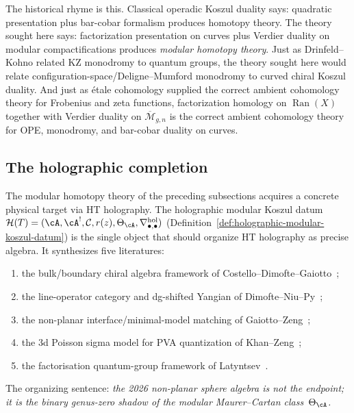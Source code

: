 The historical rhyme is this.  Classical operadic Koszul duality
says: quadratic presentation plus bar-cobar formalism produces
homotopy theory.  The theory sought here says: factorization
presentation on curves plus Verdier duality on modular
compactifications produces \emph{modular homotopy theory}.  Just as
Drinfeld--Kohno related KZ monodromy to quantum groups, the theory
sought here would relate configuration-space/Deligne--Mumford
monodromy to curved chiral Koszul duality.  And just as \'etale
cohomology supplied the correct ambient cohomology theory for
Frobenius and zeta functions, factorization homology on
$\operatorname{Ran}(X)$ together with Verdier duality on
$\overline{\mathcal{M}}_{g,n}$ is the correct ambient cohomology
theory for OPE, monodromy, and bar-cobar duality on curves.

\subsection{The holographic completion}
\label{subsec:concordance-holographic-completion}

The modular homotopy theory of the preceding subsections acquires a
concrete physical target via HT holography.  The holographic modular
Koszul datum
$\mathcal{H}(T) = (\cA, \cA^!, \mathcal{C}, r(z), \Theta_\cA,
\nabla^{\mathrm{hol}}_{\bullet,\bullet})$
(Definition~\ref{def:holographic-modular-koszul-datum})
is the single object that should organize HT holography as precise
algebra.  It synthesizes five literatures:
\begin{enumerate}[label=\textup{(\roman*)}]
\item the bulk/boundary chiral algebra framework of
  Costello--Dimofte--Gaiotto~\cite{CDG20};
\item the line-operator category and dg-shifted Yangian of
  Dimofte--Niu--Py~\cite{DNP25};
\item the non-planar interface/minimal-model matching of
  Gaiotto--Zeng~\cite{GZ26};
\item the 3d Poisson sigma model for PVA quantization of
  Khan--Zeng~\cite{KhanZeng25};
\item the factorisation quantum-group framework of
  Latyntsev~\cite{Latyntsev23}.
\end{enumerate}
The organizing sentence: \emph{the 2026 non-planar sphere algebra
is not the endpoint; it is the binary genus-zero shadow of the
modular Maurer--Cartan class~$\Theta_\cA$.}


